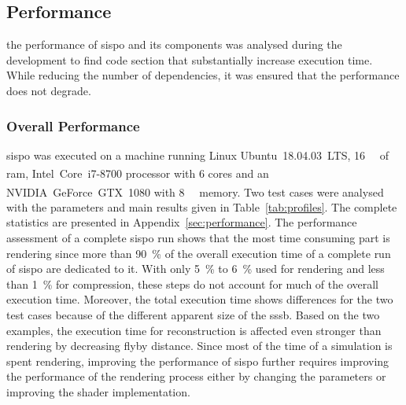 \subsection{Performance}
the performance of \gls{sispo} and its components was analysed during the development to find code section that substantially increase execution time. While reducing the number of dependencies, it was ensured that the performance does not degrade.

\subsubsection{Overall Performance}
\gls{sispo} was executed on a machine running Linux Ubuntu~18.04.03~LTS, \SI{16}{\giga\byte} of \gls{ram}, Intel\textsuperscript{\textregistered}~Core\texttrademark~i7-8700 processor with \SI{6}{} cores and an NVIDIA\textsuperscript{\textregistered}~GeForce~GTX~1080 with \SI{8}{\giga\byte} memory.
Two test cases were analysed with the parameters and main results given in Table~\ref{tab:profiles}. The complete statistics are presented in Appendix~\ref{sec:performance}. The performance assessment of a complete \gls{sispo} run shows that the most time consuming part is rendering since more than \SI{90}{\percent} of the overall execution time of a complete run of \gls{sispo} are dedicated to it. With only \SI{5}{\percent} to \SI{6}{\percent} used for rendering and less than \SI{1}{\percent} for compression, these steps do not account for much of the overall execution time. Moreover, the total execution time shows differences for the two test cases because of the different apparent size of the \gls{sssb}. Based on the two examples, the execution time for reconstruction is affected even stronger than rendering by decreasing flyby distance.
Since most of the time of a simulation is spent rendering, improving the performance of \gls{sispo} further requires improving the performance of the rendering process either by changing the parameters or improving the shader implementation.

